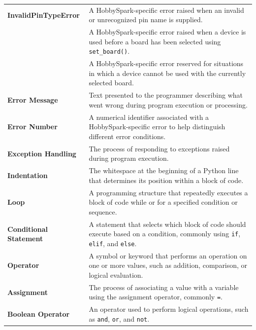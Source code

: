 \documentclass[11pt]{book}
\newcommand{\error}[1]{\texttt{\seqsplit{#1}}}
\begin{document}
\begin{longtable}{p{} p{}}
    \textbf{InvalidPinTypeError} &
    A HobbySpark-specific error raised when an invalid or unrecognized pin name is supplied. \\

    \textbf{\error{BoardNotInitializedFirstError}} &
    A HobbySpark-specific error raised when a device is used before a board has been selected using \texttt{set\_board()}. \\

    \textbf{\error{DeviceNotCompatibleWithCurrentBoardError}} &
    A HobbySpark-specific error reserved for situations in which a device cannot be used with the currently selected board. \\

    \textbf{Error Message} &
    Text presented to the programmer describing what went wrong during program execution or processing. \\

    \textbf{Error Number} &
    A numerical identifier associated with a HobbySpark-specific error to help distinguish different error conditions. \\

    \textbf{Exception Handling} &
    The process of responding to exceptions raised during program execution. \\

    \textbf{Indentation} &
    The whitespace at the beginning of a Python line that determines its position within a block of code. \\

    \textbf{Loop} &
    A programming structure that repeatedly executes a block of code while or for a specified condition or sequence. \\

    \textbf{Conditional Statement} &
    A statement that selects which block of code should execute based on a condition, commonly using \texttt{if}, \texttt{elif}, and \texttt{else}. \\

    \textbf{Operator} &
    A symbol or keyword that performs an operation on one or more values, such as addition, comparison, or logical evaluation. \\

    \textbf{Assignment} &
    The process of associating a value with a variable using the assignment operator, commonly \texttt{=}. \\

    \textbf{Boolean Operator} &
    An operator used to perform logical operations, such as \texttt{and}, \texttt{or}, and \texttt{not}. \\


\end{longtable}
\end{document}
